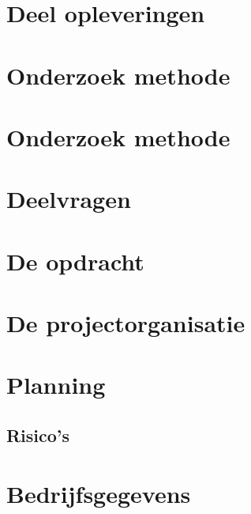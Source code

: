 \documentclass{report} %
\begin{document}
\chapter{Deel opleveringen} %

\chapter{Onderzoek methode} %

\chapter{Onderzoek methode} %

\chapter{Deelvragen} %


\chapter{De opdracht} %
\chapter{De projectorganisatie} %

\chapter{Planning} %
\section{Risico's} %


\chapter{Bedrijfsgegevens} %
\end{document}
